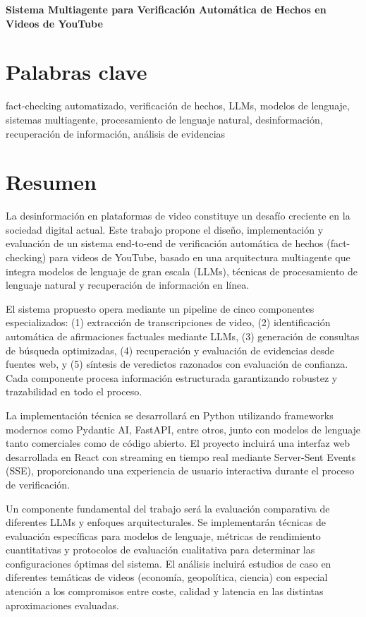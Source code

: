 \documentclass[12pt,a4paper]{article}
\begin{document}
\textbf{Sistema Multiagente para Verificación Automática de Hechos en Videos de YouTube}

\section{Palabras clave}

fact-checking automatizado, verificación de hechos, LLMs, modelos de lenguaje, sistemas multiagente, procesamiento de lenguaje natural, desinformación, recuperación de información, análisis de evidencias

\section{Resumen}

La desinformación en plataformas de video constituye un desafío creciente en la sociedad digital actual. Este trabajo propone el diseño, implementación y evaluación de un sistema end-to-end de verificación automática de hechos (fact-checking) para videos de YouTube, basado en una arquitectura multiagente que integra modelos de lenguaje de gran escala (LLMs), técnicas de procesamiento de lenguaje natural y recuperación de información en línea.

El sistema propuesto opera mediante un pipeline de cinco componentes especializados: (1) extracción de transcripciones de video, (2) identificación automática de afirmaciones factuales mediante LLMs, (3) generación de consultas de búsqueda optimizadas, (4) recuperación y evaluación de evidencias desde fuentes web, y (5) síntesis de veredictos razonados con evaluación de confianza. Cada componente procesa información estructurada garantizando robustez y trazabilidad en todo el proceso.

La implementación técnica se desarrollará en Python utilizando frameworks modernos como Pydantic AI, FastAPI, entre otros, junto con modelos de lenguaje tanto comerciales como de código abierto. El proyecto incluirá una interfaz web desarrollada en React con streaming en tiempo real mediante Server-Sent Events (SSE), proporcionando una experiencia de usuario interactiva durante el proceso de verificación.

Un componente fundamental del trabajo será la evaluación comparativa de diferentes LLMs y enfoques arquitecturales. Se implementarán técnicas de evaluación específicas para modelos de lenguaje, métricas de rendimiento cuantitativas y protocolos de evaluación cualitativa para determinar las configuraciones óptimas del sistema. El análisis incluirá estudios de caso en diferentes temáticas de videos (economía, geopolítica, ciencia) con especial atención a los compromisos entre coste, calidad y latencia en las distintas aproximaciones evaluadas.
\end{document}
